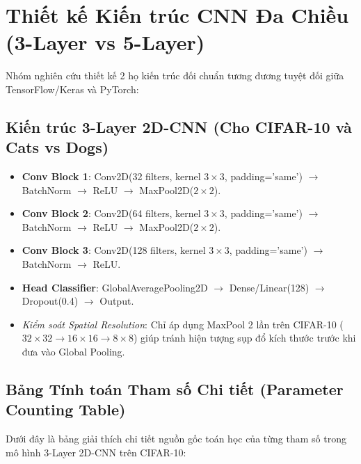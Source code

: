 \documentclass[12pt,a4paper]{report}
\begin{document}
\chapter{Thiết kế Kiến trúc CNN Đa Chiều (3-Layer vs 5-Layer)}

Nhóm nghiên cứu thiết kế 2 họ kiến trúc đối chuẩn tương đương tuyệt đối giữa TensorFlow/Keras và PyTorch:

\section{Kiến trúc 3-Layer 2D-CNN (Cho CIFAR-10 và Cats vs Dogs)}
\begin{itemize}
    \item \textbf{Conv Block 1}: Conv2D(32 filters, kernel $3 \times 3$, padding='same') $\to$ BatchNorm $\to$ ReLU $\to$ MaxPool2D($2 \times 2$).
    \item \textbf{Conv Block 2}: Conv2D(64 filters, kernel $3 \times 3$, padding='same') $\to$ BatchNorm $\to$ ReLU $\to$ MaxPool2D($2 \times 2$).
    \item \textbf{Conv Block 3}: Conv2D(128 filters, kernel $3 \times 3$, padding='same') $\to$ BatchNorm $\to$ ReLU.
    \item \textbf{Head Classifier}: GlobalAveragePooling2D $\to$ Dense/Linear(128) $\to$ Dropout(0.4) $\to$ Output.
    \item \textit{Kiểm soát Spatial Resolution}: Chỉ áp dụng MaxPool 2 lần trên CIFAR-10 ($32 \times 32 \to 16 \times 16 \to 8 \times 8$) giúp tránh hiện tượng sụp đổ kích thước trước khi đưa vào Global Pooling.
\end{itemize}

\section{Bảng Tính toán Tham số Chi tiết (Parameter Counting Table)}
Dưới đây là bảng giải thích chi tiết nguồn gốc toán học của từng tham số trong mô hình 3-Layer 2D-CNN trên CIFAR-10:
\end{document}
